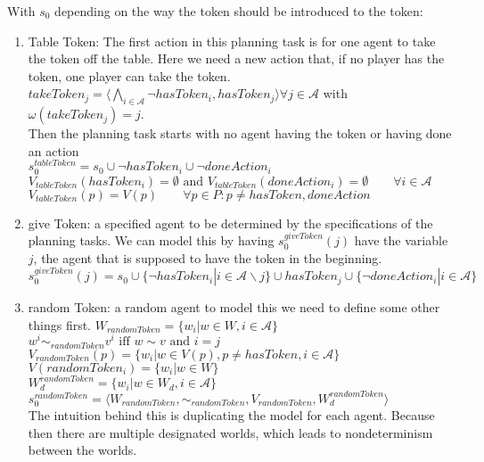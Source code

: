 With $s_0$ depending on the way the token should be introduced to the token:
\begin{enumerate}
  \item Table Token: The first action in this planning task is for one agent to take the token off the table. Here we need a new action that, if no player has the token, one player can take the token.\\
    $takeToken_j=\langle \bigwedge\limits_{i \in \mathcal{A}}
    \neg hasToken_i, hasToken_j \rangle \forall j \in \mathcal{A}$ with $\omega(takeToken_j)=j$. \\
    Then the planning task starts with no agent having the token or having done an action \\
    $s_0^{tableToken} = s_0 \cup \neg hasToken_i \cup \neg doneAction_i$ \\
    $V_{tableToken}(hasToken_i)=\emptyset \text{ and } V_{tableToken}(doneAction_i)=\emptyset \qquad \forall i\in \mathcal{A}$\\
    $V_{tableToken}(p)=V(p) \qquad \forall p\in P : p \not = hasToken, doneAction$

  \item give Token:
    a specified agent to be determined by the specifications of the planning tasks. We can model this by having $s_0^{giveToken}(j)$ have the variable $j$, the agent that is supposed to have the token in the beginning. \\
     $s_0^{giveToken}(j) = s_0 \cup \{\neg hasToken_i|i \in \mathcal{A} \backslash j\} \cup hasToken_j \cup \{\neg doneAction_i|i \in \mathcal{A}\}$

  \item random Token:
    a random agent
    to model this we need to define some other things first.
    $W_{randomToken}=\{w_i|w \in W, i\in \mathcal{A}\}$ \\
    $w^i \sim_{randomToken} v^i \text{ iff } w \sim v \text{ and } i=j$ \\
    $V_{randomToken}(p)=\{w_i|w\in V(p), p \not = hasToken, i\in \mathcal{A}\}$ \\
    $V(randomToken_i)=\{w_i|w \in W\}$ \\
    $W^{randomToken}_d=\{w_i|w\in W_d, i\in \mathcal{A}\}$ \\
    $s_0^{randomToken}=\langle W_{randomToken}, \sim_{randomToken}, V_{randomToken}, W^{randomToken}_d \rangle$ \\
    The intuition behind this is duplicating the model for each agent. Because then there are multiple designated worlds, which leads to nondeterminism between the worlds.
\end{enumerate}



